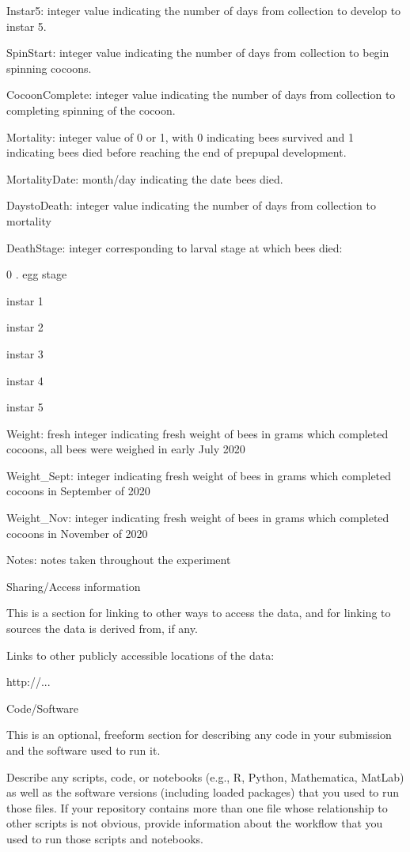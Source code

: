 Instar5: integer value indicating the number of days from collection to develop to instar 5.

SpinStart: integer value indicating the number of days from collection to begin spinning cocoons.

CocoonComplete: integer value indicating the number of days from collection to completing spinning of the cocoon.

Mortality: integer value of 0 or 1, with 0 indicating bees survived and 1 indicating bees died before reaching the end of prepupal development.

MortalityDate: month/day indicating the date bees died. 

DaystoDeath: integer value indicating the number of days from collection to mortality

DeathStage: integer corresponding to larval stage at which bees died: 

       0 .  egg stage

instar 1

instar 2

instar 3

instar 4

instar 5

Weight: fresh integer indicating fresh weight of bees in grams which completed cocoons, all bees were weighed in early July 2020

Weight_Sept: integer indicating fresh weight of bees in grams  which completed cocoons in September of 2020

Weight_Nov: integer indicating fresh weight of bees in grams which completed cocoons in November of 2020

Notes: notes taken throughout the experiment 

Sharing/Access information

This is a section for linking to other ways to access the data, and for linking to sources the data is derived from, if any.

Links to other publicly accessible locations of the data:

http://...

Code/Software

This is an optional, freeform section for describing any code in your submission and the software used to run it.

Describe any scripts, code, or notebooks (e.g., R, Python, Mathematica, MatLab) as well as the software versions (including loaded packages) that you used to run those files. If your repository contains more than one file whose relationship to other scripts is not obvious, provide information about the workflow that you used to run those scripts and notebooks.
